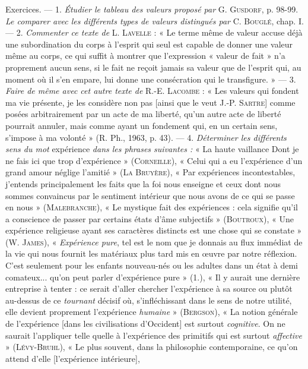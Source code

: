 Exercices. — 1. {\it Étudier le tableau des valeurs proposé par} G. \textsc{Gusdorf},
p. 98-99. {\it Le comparer avec les différents types de valeurs distingués par}
C. \textsc{Bouglé}, chap. I. — 2. {\it Commenter ce texte de} L. \textsc{Lavelle} : « Le terme
même de valeur accuse déjà une subordination du corps à l’esprit qui seul
est capable de donner une valeur même au corps, ce qui suffit à montrer
que l'expression « valeur de fait » n’a proprement aucun sens, si le fait ne
reçoit jamais sa valeur que de l'esprit qui, au moment où il s’en empare,
lui donne une consécration qui le transfigure. » — 3. {\it Faire de même avec cet
autre texte de} R.-E. \textsc{Lacombe} : « Les valeurs qui fondent ma vie présente,
je les considère non pas [ainsi que le veut J.-P. \textsc{Sartre}] comme posées
arbitrairement par un acte de ma liberté, qu’un autre acte de liberté pourrait
annuler, mais comme ayant un fondement qui, en un certain sens,
s'impose à ma volonté » (R. Ph., 1963, p. 43). — 4. {\it Déterminer les différents
sens du mot} expérience {\it dans les phrases suivantes :} « La haute vaillance Dont
je ne fais ici que trop d'expérience » (\textsc{Corneille}), « Celui qui a eu l’expérience
d’un grand amour néglige l'amitié » (\textsc{La Bruyère}), « Par expériences
incontestables, j'entends principalement les faits que la foi nous enseigne et
ceux dont nous sommes convaincus par le sentiment intérieur que nous
avons de ce qui se passe en nous » (\textsc{Malebranche}), « Le mystique fait des
expériences : cela signifie qu’il a conscience de passer par certains états d'âme
subjectifs » (\textsc{Boutroux}), « Une expérience religieuse ayant ses caractères
distincts est une chose qui se constate » (W. \textsc{James}), « {\it Expérience pure}, tel
est le nom que je donnais au flux immédiat de la vie qui nous fournit les
matériaux plus tard mis en œuvre par notre réflexion. C’est seulement pour
les enfants nouveau-nés ou les adultes dans un état à demi comateux...
qu’on peut parler d'expérience pure » (1.), « Il y aurait une dernière entreprise
à tenter : ce serait d'aller chercher l'expérience à sa source ou plutôt
au-dessus de ce {\it tournant} décisif où, s’infléchissant dans le sens de notre
utilité, elle devient proprement l'expérience {\it humaine} » (\textsc{Bergson}), « La
notion générale de l'expérience [dans les civilisations d'Occident] est surtout
{\it cognitive}. On ne saurait l’appliquer telle quelle à l'expérience des primitifs
qui est surtout {\it affective} » (\textsc{Lévy-Bruhl}), « Le plus souvent, dans la philosophie
contemporaine, ce qu’on attend d'elle [l'expérience intérieure],
